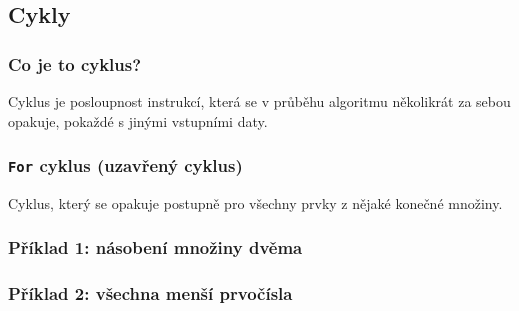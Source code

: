 \documentclass[aspectratio=169,11pt,handout]{beamer}
\begin{document}
\subsection[Cykly]{Cykly}

\begin{frame}
 \frametitle{Co je to cyklus?}
 \begin{tcolorbox}[title=Cyklus,center,width=.9\textwidth]
  Cyklus je posloupnost instrukcí, která se v průběhu algoritmu
  \alert{několikrát za sebou opakuje}, pokaždé s jinými vstupními daty.
 \end{tcolorbox}
\end{frame}

\begin{frame}
 \frametitle{\texttt{For} cyklus (uzavřený cyklus)}
 \begin{tcolorbox}[title=\texttt{For} cyklus,center,width=.9\textwidth]
  Cyklus, který se opakuje postupně pro \alert{všechny prvky z nějaké konečné
  množiny}.
 \end{tcolorbox}
\end{frame}

\begin{frame}
 \frametitle{Příklad 1: násobení množiny dvěma}
 \centering
\end{frame}

\begin{frame}
 \frametitle{Příklad 2: všechna menší prvočísla}
 \centering
\end{frame}
\end{document}
